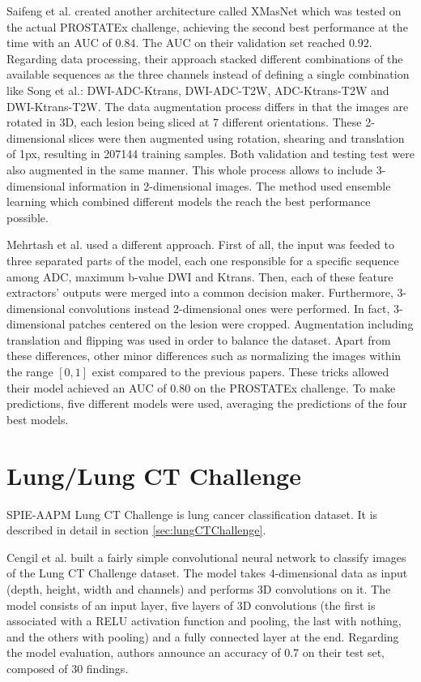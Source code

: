 Saifeng et al. \cite{31} created another architecture called XMasNet which was tested on the actual PROSTATEx challenge, achieving the second best performance at the time with an AUC of $0.84$. The AUC on their validation set reached $0.92$. Regarding data processing, their approach stacked different combinations of the available sequences as the three channels instead of defining a single combination like Song et al.: DWI-ADC-Ktrans, DWI-ADC-T2W, ADC-Ktrans-T2W and DWI-Ktrans-T2W. The data augmentation process differs in that the images are rotated in 3D, each lesion being sliced at 7 different orientations. These 2-dimensional slices were then augmented using rotation, shearing and translation of 1px, resulting in 207144 training samples. Both validation and testing test were also augmented in the same manner. This whole process allows to include 3-dimensional information in 2-dimensional images. The method used ensemble learning which combined different models the reach the best performance possible. 

Mehrtash et al. \cite{01} used a different approach. First of all, the input was feeded to three separated parts of the model, each one responsible for a specific sequence among ADC, maximum b-value DWI and Ktrans. Then, each of these feature extractors' outputs were merged into a common decision maker. Furthermore, 3-dimensional convolutions instead 2-dimensional ones were performed. In fact, 3-dimensional patches centered on the lesion were cropped. Augmentation including translation and flipping was used in order to balance the dataset. Apart from these differences, other minor differences such as normalizing the images within the range $[0,1]$ exist compared to the previous papers. These tricks allowed their model achieved an AUC of $0.80$ on the PROSTATEx challenge. To make predictions, five different models were used, averaging the predictions of the four best models. 


\section{Lung/Lung CT Challenge}
SPIE-AAPM Lung CT Challenge is lung cancer classification dataset. It is described in detail in section \ref{sec:lungCTChallenge}.

Cengil et al. \cite{02} built a fairly simple convolutional neural network to classify images of the Lung CT Challenge dataset. The model takes 4-dimensional data as input (depth, height, width and channels) and performs 3D convolutions on it. The model consists of an input layer, five layers of 3D convolutions (the first is associated with a RELU activation function and pooling, the last with nothing, and the others with pooling) and a fully connected layer at the end. Regarding the model evaluation, authors announce an accuracy of 0.7 on their test set, composed of 30 findings.


